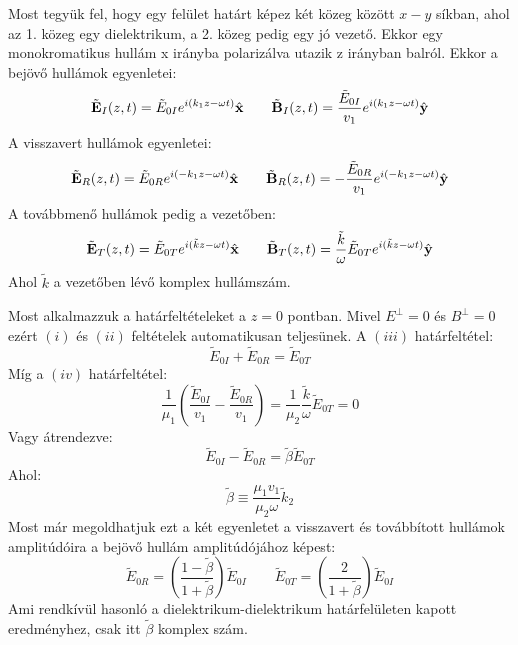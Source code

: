 \documentclass[a4paper,12pt]{article}
\begin{document}
Most tegyük fel, hogy egy felület határt képez két közeg között $x-y$ síkban, ahol az 1. közeg egy dielektrikum, a 2. közeg pedig egy jó vezető. Ekkor egy monokromatikus hullám x irányba polarizálva utazik
z irányban balról. Ekkor a bejövő hullámok egyenletei:
\begin{equation}
    \tilde{\bold{E}}_I(z, t) = \tilde{E}_{0I} e^{i(k_1 z - \omega t)} \hat{\bold{x}} \qquad \tilde{\bold{B}}_I(z, t) = \frac{\tilde{E}_{0I}}{v_1} e^{i(k_1 z - \omega t)} \hat{\bold{y}}
\end{equation}
A visszavert hullámok egyenletei:
\begin{equation}
    \tilde{\bold{E}}_R(z, t) = \tilde{E}_{0R} e^{i(-k_1 z - \omega t)} \hat{\bold{x}} \qquad \tilde{\bold{B}}_R(z, t) = -\frac{\tilde{E}_{0R}}{v_1} e^{i(-k_1 z - \omega t)} \hat{\bold{y}}
\end{equation}
A továbbmenő hullámok pedig a vezetőben:
\begin{equation}
    \tilde{\bold{E}}_T(z, t) = \tilde{E}_{0T} e^{i(\tilde{k}z - \omega t)} \hat{\bold{x}} \qquad \tilde{\bold{B}}_T(z, t) = \frac{\tilde{k}}{\omega} \tilde{E}_{0T} e^{i(\tilde{k}z - \omega t)} \hat{\bold{y}}
\end{equation}
Ahol $\tilde{k}$ a vezetőben lévő komplex hullámszám.

Most alkalmazzuk a határfeltételeket a $z = 0$ pontban. Mivel $E^{\perp} = 0$ és $B^\perp = 0$ ezért $(i)$ és $(ii)$ feltételek automatikusan teljesünek. A $(iii)$ határfeltétel:
\begin{equation}
    \tilde{E}_{0I} + \tilde{E}_{0R} = \tilde{E}_{0T}
\end{equation}
Míg a $(iv)$ határfeltétel:
\begin{equation}
    \frac{1}{\mu_1} \left( \frac{\tilde{E}_{0I}}{v_1} - \frac{\tilde{E}_{0R}}{v_1} \right) = \frac{1}{\mu_2} \frac{\tilde{k}}{\omega} \tilde{E}_{0T} = 0
\end{equation}
Vagy átrendezve:
\begin{equation}
    \tilde{E}_{0I} - \tilde{E}_{0R} = \tilde{\beta} \tilde{E}_{0T}
\end{equation}
Ahol:
\begin{equation}
    \tilde{\beta} \equiv \frac{\mu_1 v_1}{\mu_2 \omega} \tilde{k}_2
\end{equation}
Most már megoldhatjuk ezt a két egyenletet a visszavert és továbbított hullámok amplitúdóira a bejövő hullám amplitúdójához képest:
\begin{equation}
    \boxed{\tilde{E}_{0R} = \left( \frac{1 - \tilde{\beta}}{1 + \tilde{\beta}} \right) \tilde{E}_{0I} \qquad \tilde{E}_{0T} = \left( \frac{2}{1 + \tilde{\beta}} \right) \tilde{E}_{0I}}
\end{equation}
Ami rendkívül hasonló a dielektrikum-dielektrikum határfelületen kapott eredményhez, csak itt $\tilde{\beta}$ komplex szám.
\end{document}
